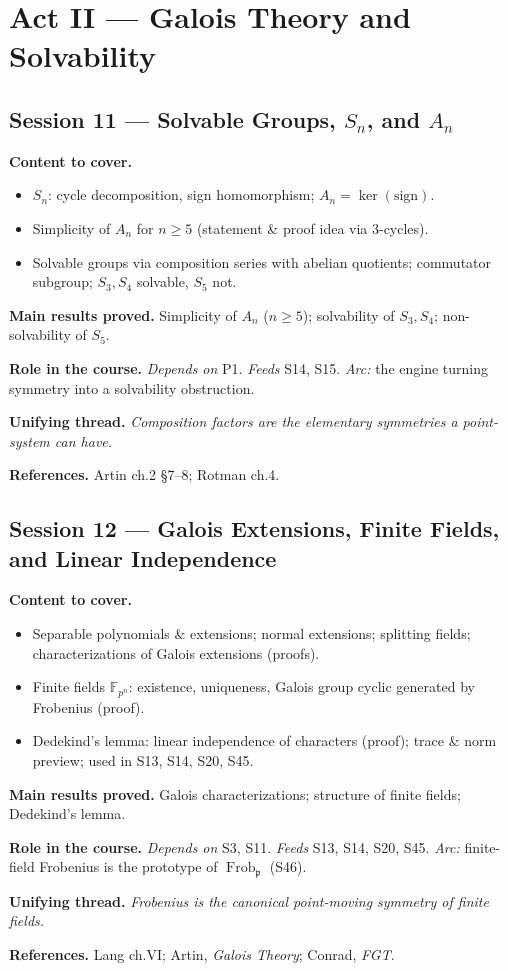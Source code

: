 \documentclass[11pt,a4paper]{article}
\newcommand{\sess}[2]{\subsection[#1. #2]{Session #1 --- #2}}
\newcommand{\chead}{\par\smallskip\noindent\textbf{Content to cover.}}
\newcommand{\proved}[1]{\par\smallskip\noindent\textbf{Main results proved.} #1}
\newcommand{\role}[1]{\par\smallskip\noindent\textbf{Role in the course.} #1}
\newcommand{\thread}[1]{\par\smallskip\noindent\textbf{Unifying thread.} \textit{#1}}
\newcommand{\srefs}[1]{\par\smallskip\noindent\textbf{References.} #1}
\newcommand{\F}{\mathbb{F}}
\newcommand{\Frob}{\operatorname{Frob}}
\newcommand{\p}{\mathfrak{p}}
\begin{document}
	\section{Act II --- Galois Theory and Solvability}
	
	\sess{11}{Solvable Groups, $S_n$, and $A_n$}
	\chead
	\begin{itemize}
		\item $S_n$: cycle decomposition, sign homomorphism; $A_n=\ker(\mathrm{sign})$.
		\item Simplicity of $A_n$ for $n\geq5$ (statement \& proof idea via 3-cycles).
		\item Solvable groups via composition series with abelian quotients; commutator subgroup; $S_3,S_4$ solvable, $S_5$ not.
	\end{itemize}
	\proved{Simplicity of $A_n$ ($n\geq5$); solvability of $S_3,S_4$; non-solvability of $S_5$.}
	\role{\emph{Depends on} P1. \emph{Feeds} S14, S15. \emph{Arc:} the engine turning symmetry into a solvability obstruction.}
	\thread{Composition factors are the elementary symmetries a point-system can have.}
	\srefs{Artin ch.2 \S7--8; Rotman ch.4.}
	
	\sess{12}{Galois Extensions, Finite Fields, and Linear Independence}
	\chead
	\begin{itemize}
		\item Separable polynomials \& extensions; normal extensions; splitting fields; characterizations of Galois extensions (proofs).
		\item Finite fields $\F_{p^n}$: existence, uniqueness, Galois group cyclic generated by Frobenius (proof).
		\item Dedekind's lemma: linear independence of characters (proof); trace \& norm preview; used in S13, S14, S20, S45.
	\end{itemize}
	\proved{Galois characterizations; structure of finite fields; Dedekind's lemma.}
	\role{\emph{Depends on} S3, S11. \emph{Feeds} S13, S14, S20, S45. \emph{Arc:} finite-field Frobenius is the prototype of $\Frob_\p$ (S46).}
	\thread{Frobenius is the canonical point-moving symmetry of finite fields.}
	\srefs{Lang ch.VI; Artin, \emph{Galois Theory}; Conrad, \emph{FGT}.}
	
\end{document}
